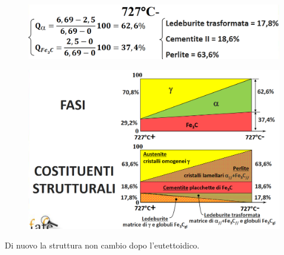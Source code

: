 \documentclass{article}
\begin{document}
{\begin{figure}[h!]
            \end{figure}
            \begin{figure}[h!]
                \centering
                \includegraphics[width=.7\linewidth]{L14 - C = 2,5 Calcolo a 727-.png}
            \end{figure}
            \begin{figure}[h!]
                \centering
                \includegraphics[width=.7\linewidth]{L14 - C = 2,5 Diagrammi Fase e Costituenti da 727+ a 727-.png}
            \end{figure}
            \newpage
            Di nuovo la struttura non cambio dopo l'eutettoidico.\\
}
\end{document}

